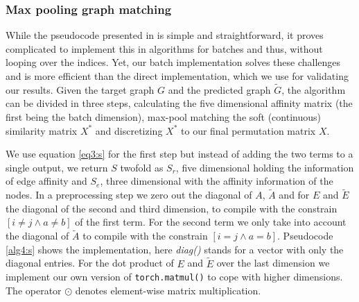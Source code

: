 
\subsubsection{Max pooling graph matching}

While the pseudocode presented in \cite{cho_finding_2014} is simple and straightforward, it proves complicated to implement this in algorithms for batches and thus, without looping over the indices. Yet, our batch implementation solves these challenges and is more efficient than the direct implementation, which we use for validating our results. Given the target graph $G$ and the predicted graph $\tilde{G}$, the algorithm can be divided in three steps, calculating the five dimensional affinity matrix (the first being the batch dimension), max-pool matching the soft (continuous) similarity matrix $X^*$ and discretizing $X^*$ to our final permutation matrix $X$.

We use equation \ref{eq3:s} for the first step but instead of adding the two terms to a single output, we return $S$ twofold as $S_r$, five dimensional holding the information of edge affinity and $S_e$, three dimensional with the affinity information of the nodes. In a preprocessing step we zero out the diagonal of $A$, $\tilde{A}$ and for $E$ and $\tilde{E}$ the diagonal of the second and third dimension, to compile with the constrain $[i \neq j \wedge a \neq b]$ of the first term. For the second term we only take into account the diagonal of $\tilde{A}$ to compile with the constrain $[i=j \wedge a=b]$. Pseudocode \ref{alg4:s} shows the implementation, here \textit{diag()} stands for a vector with only the diagonal entries. For the dot product of $E$ and $\tilde{E}$ over the last dimension we implement our own version of \texttt{torch.matmul()} to cope with higher dimensions. The operator $\odot$ denotes element-wise matrix multiplication.



